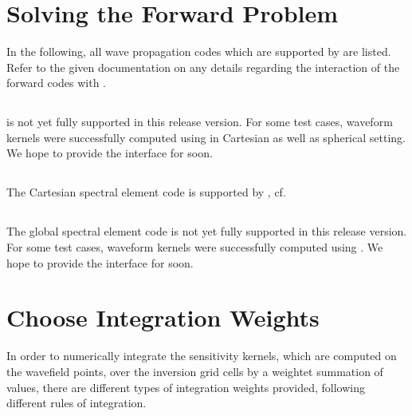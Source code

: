 \section{Solving the Forward Problem} \label{basic_steps,sec:forward_problem}
%
In the following, all wave propagation codes which are supported by \ASKI are listed.
Refer to the given documentation on any details regarding the interaction of the forward codes with \ASKI.
\subsection*{}
 is not yet fully supported in this release version. For some test cases, waveform kernels were
successfully computed using  in Cartesian as well as spherical setting. We hope to provide the 
 interface for \ASKI soon.
\subsection*{}
The Cartesian spectral element code  is supported by \ASKI, 
cf.~\cite{Specfem3D_Cartesian_for_ASKI}
\subsection*{}
The global spectral element code  is not yet fully supported in this release version. 
For some test cases, waveform kernels were successfully computed using . We hope to 
provide the  interface for \ASKI soon.
%
\section{Choose Integration Weights} \label{basic_steps,sec:intw}
%
In order to numerically integrate the sensitivity kernels, which are computed on the wavefield points, 
over the inversion grid cells by a weightet summation of values, there are different 
types of integration weights provided, following different rules of integration.

